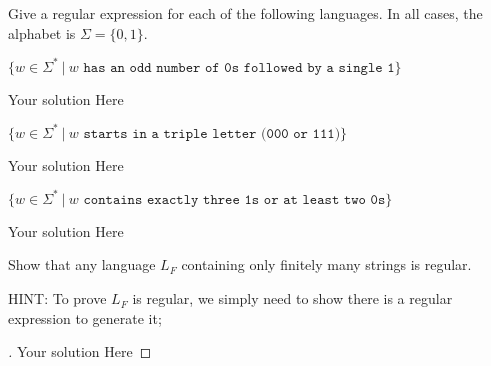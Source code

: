 \documentclass[12pt]{article}
\newenvironment{exercise}[2][Exercise]{\begin{trivlist}
\item[\hskip \labelsep {\bfseries #1}\hskip \labelsep {\bfseries #2.}]}{\end{trivlist}}
\newenvironment{solution}[1][{\color{red} Solution:}]{\begin{trivlist}
\item[\hskip \labelsep {\bfseries #1}\hskip \labelsep {\bfseries}]}{\end{trivlist}}
\begin{document}
\begin{exercise}{2}

Give a regular expression for each of the following languages. In all cases, the alphabet is $\Sigma = \{0,1\}$.
\begin{enumerate}[(a)]
	\item $\{ w \in \Sigma^* \ | \ w \texttt{ has an odd number of 0s followed by a single 1}\}$
	\begin{solution}
Your solution Here
	\end{solution}
	
	\item $\{w \in \Sigma^* \ | \ w \texttt{ starts in a triple letter (000 or 111)}\}$
	\begin{solution}
Your solution Here
	\end{solution}
	
	\item $\{w \in \Sigma^* \ | \ w \texttt{ contains exactly three 1s or at least two 0s}\}$
	\begin{solution}
Your solution Here
	\end{solution}
	
\end{enumerate}

\end{exercise}

\clearpage
\begin{exercise}{3}
Show that any language $L_F$ containing only finitely many strings is regular.
\end{exercise}

\begin{solution}

HINT: To prove $L_F$ is regular, we simply need to show there is a regular expression to generate it;

\begin{proof}[\unskip\nopunct]
Your solution Here
\end{proof}

\end{solution}
\end{document}
